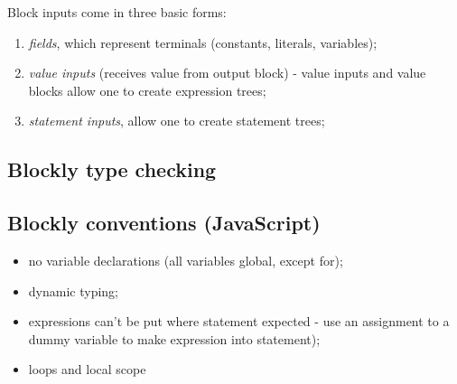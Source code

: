 Block inputs come in three basic forms:
\begin{enumerate}
  \item \emph{fields}, which represent terminals (constants, literals, variables);
  \item \emph{value inputs} (receives value from output block) - value inputs
      and value blocks allow one to create expression trees;
  \item \emph{statement inputs}, allow one to create statement trees;
\end{enumerate}

\subsection{Blockly type checking}

\subsection{Blockly conventions (JavaScript)}
\begin{itemize}
  \item no variable declarations (all variables global, except for);
  \item dynamic typing;
  \item expressions can't be put where statement expected 
  - use an assignment to a dummy variable to make expression into statement);
  \item loops and local scope
\end{itemize}